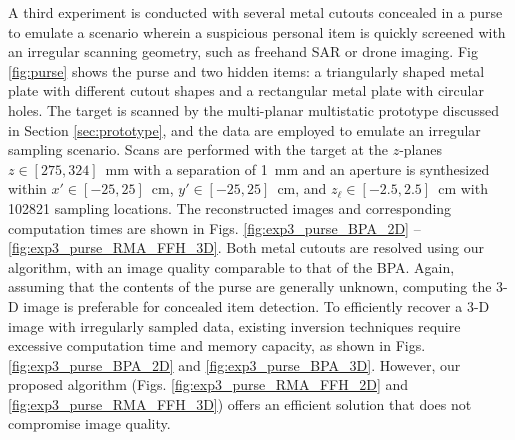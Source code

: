 \documentclass{ieeeaccess}
\begin{document}
A third experiment is conducted with several metal cutouts concealed in a purse to emulate a scenario wherein a suspicious personal item is quickly screened with an irregular scanning geometry, such as freehand SAR or drone imaging.
Fig \ref{fig:purse} shows the purse and two hidden items: a triangularly shaped metal plate with different cutout shapes and a rectangular metal plate with circular holes.
The target is scanned by the multi-planar multistatic prototype discussed in Section \ref{sec:prototype}, and the data are employed to emulate an irregular sampling scenario.
Scans are performed with the target at the $z$-planes \mbox{$z \in [275, 324]$ mm} with a separation of \mbox{1 mm} and an aperture is synthesized within \mbox{$x' \in [-25,25]$ cm}, \mbox{$y' \in [-25,25]$ cm}, and \mbox{$z_\ell \in [-2.5,2.5]$ cm} with 102821 sampling locations.
The reconstructed images and corresponding computation times are shown in Figs. \ref{fig:exp3_purse_BPA_2D} -- \ref{fig:exp3_purse_RMA_FFH_3D}.
Both metal cutouts are resolved using our algorithm, with an image quality comparable to that of the BPA. 
Again, assuming that the contents of the purse are generally unknown, computing the \mbox{3-D} image is preferable for concealed item detection.
To efficiently recover a \mbox{3-D} image with irregularly sampled data, existing inversion techniques require excessive computation time and memory capacity, as shown in Figs. \ref{fig:exp3_purse_BPA_2D} and \ref{fig:exp3_purse_BPA_3D}.
However, our proposed algorithm (Figs. \ref{fig:exp3_purse_RMA_FFH_2D} and \ref{fig:exp3_purse_RMA_FFH_3D}) offers an efficient solution that does not compromise image quality.
\end{document}
